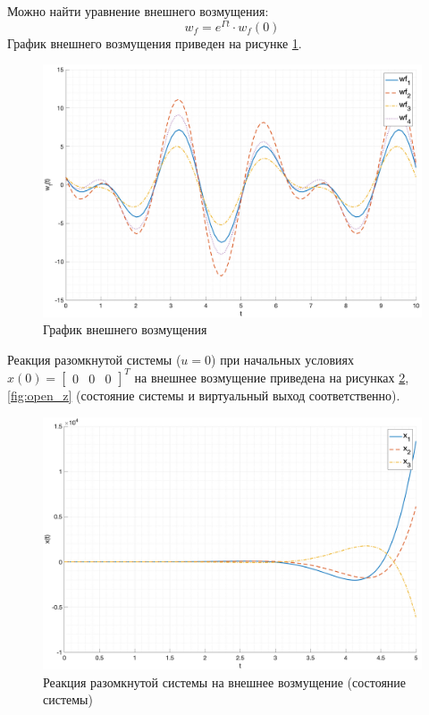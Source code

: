 Можно найти уравнение внешнего возмущения: 
\begin{equation}
    w_f = e^{\Gamma t} \cdot w_f(0) 
\end{equation}
График внешнего возмущения приведен на рисунке \ref{fig:wf}.
\begin{figure}[ht!]
    \centering
    \includegraphics[width=\textwidth]{media/plots/wf.png}
    \caption{График внешнего возмущения}
    \label{fig:wf}
\end{figure} 
Реакция разомкнутой системы ($u = 0$) при начальных условиях $x(0) = \begin{bmatrix}0 & 0 & 0 \end{bmatrix}^T$ 
на внешнее возмущение приведена на рисунках \ref{fig:open_x}, \ref{fig:open_z} (состояние системы и виртуальный выход соответственно).
\begin{figure}[ht!]
    \centering
    \includegraphics[width=\textwidth]{media/plots/open_x.png}
    \caption{Реакция разомкнутой системы на внешнее возмущение (состояние системы)}
    \label{fig:open_x}
\end{figure}
